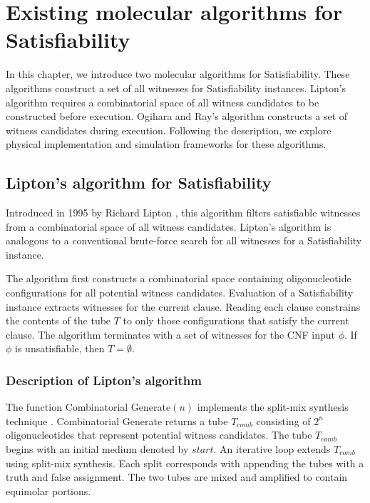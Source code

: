 \chapter{Existing molecular algorithms for {\sc Satisfiability}}


In this chapter, we introduce two molecular algorithms for {\sc Satisfiability}.  These algorithms construct a set of all witnesses for {\sc Satisfiability} instances.  Lipton's algorithm requires a combinatorial space of all witness candidates to be constructed before execution.  Ogihara and Ray's algorithm constructs a set of witness candidates during execution.  Following the description, we explore physical implementation and simulation frameworks for these algorithms.
\section{Lipton's algorithm for {\sc Satisfiability}}


Introduced in 1995 by Richard Lipton \cite{Lipton95usingdna}, this algorithm filters satisfiable witnesses from a combinatorial space of all witness candidates.  Lipton's algorithm is analogous to a conventional brute-force search for all witnesses for a {\sc Satisfiability} instance.

The algorithm first constructs a combinatorial space containing oligonucleotide configurations for all potential witness candidates.  Evaluation of a {\sc Satisfiability} instance extracts witnesses for the current clause.  Reading each clause constrains the contents of the tube $T$ to only those configurations that satisfy the current clause.  The algorithm terminates with a set of witnesses for the CNF input $\phi$.  If $\phi$ is unsatisfiable, then $T = \emptyset$.  

	\subsection{Description of Lipton's algorithm}
		
The function {\sc Combinatorial Generate}$(n)$ implements the split-mix synthesis technique \cite{furka1982, furkaBook}.  {\sc Combinatorial Generate} returns a tube $T_{comb}$ consisting of $2^n$ oligonucleotides that represent potential witness candidates.  The tube $T_{comb}$ begins with an initial medium denoted by $start$.  An iterative loop extends $T_{comb}$ using split-mix synthesis.  Each split corresponds with appending the tubes with a truth and false assignment.  The two tubes are mixed and amplified to contain equimolar portions.  


